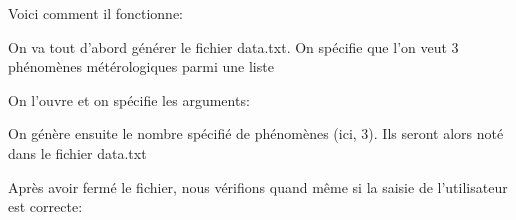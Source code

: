 \documentclass[letterpaper,10pt,english]{sphinxmanual}
\begin{document}
\sphinxAtStartPar
Voici comment il fonctionne:

\sphinxAtStartPar
On va tout d’abord générer le fichier data.txt.
On spécifie que l’on veut 3 phénomènes métérologiques parmi une liste

\begin{sphinxVerbatim}[commandchars=\\\{\}]
 
\end{sphinxVerbatim}

\sphinxAtStartPar
On l’ouvre et on spécifie les arguments:

\begin{sphinxVerbatim}[commandchars=\\\{\}]
\PYG{p}{[}  \PYG{p}{]}
\end{sphinxVerbatim}

\sphinxAtStartPar
On génère ensuite le nombre spécifié de phénomènes (ici, 3). Ils seront alors noté dans le fichier data.txt

\begin{sphinxVerbatim}[commandchars=\\\{\}]
   
    \PYG{p}{[}   \PYG{p}{]}
\end{sphinxVerbatim}

\sphinxAtStartPar
Après avoir fermé le fichier, nous vérifions quand même si la saisie de l’utilisateur est correcte:

\begin{sphinxVerbatim}[commandchars=\\\{\}]
 
\PYG{p}{[}\PYG{p}{]}
\end{sphinxVerbatim}
\end{document}
